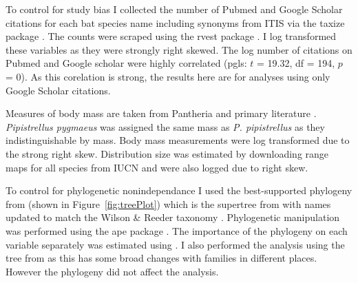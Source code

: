 To control for study bias I collected the number of Pubmed and Google Scholar citations for each bat species name including synonyms from ITIS \cite{itis} via the taxize package \cite{chamberlain2013taxize}.
The counts were scraped using the rvest package \cite{rvest}.
I log transformed these variables as they were strongly right skewed.
The log number of citations on Pubmed and Google scholar were highly correlated (pgls: $t$ = 19.32, df = 194, $p$ = 0).
As this corelation is strong, the results here are for analyses using only Google Scholar citations.

Measures of body mass are taken from Pantheria \cite{jones2009pantheria} and primary literature \cite{canals2005relative, arita1993rarity, lopez2014echolocation, orr2013does, lim2001bat, aldridge1987turning, ma2003dietary, owen2003home, henderson2008movements, heaney2012nyctalus, oleksy2015high, zhang2009recent}. 
\emph{Pipistrellus pygmaeus} was assigned the same mass as \emph{P. pipistrellus} as they indistinguishable by mass.
Body mass measurements were log transformed due to the strong right skew.
Distribution size was estimated by downloading range maps for all species from IUCN \cite{iucn} and were also logged due to right skew.


To control for phylogenetic nonindependance I used the best-supported phylogeny from \textcite{fritz2009geographical} (shown in Figure~\ref{fig:treePlot}) which is the supertree from \cite{bininda2007delayed} with names updated to match the Wilson \& Reeder taxonomy \cite{wilson2005mammal}.
Phylogenetic manipulation was performed using the ape package \cite{ape}.
The importance of the phylogeny on each variable separately was estimated using \cite{caper}.
I also performed the analysis using the tree from \cite{jones2005bats} as this has some broad changes with families in different places.
However the phylogeny did not affect the analysis.







		
		























